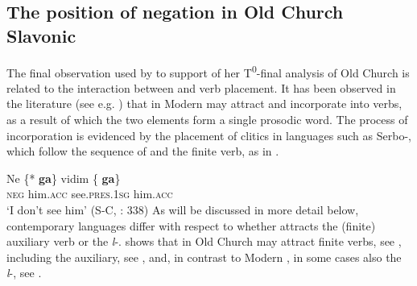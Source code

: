\documentclass[output=paper,modfonts,newtxmath,hidelinks]{langscibook}
\begin{document}
\subsection{The position of negation in Old Church Slavonic} \label{11:s3.2}

The final observation used by \citet{pancheva2008} to support of her T\textsuperscript{0}{}-final analysis of Old Church  is related to the interaction between  and verb placement. It has been observed in the literature (see e.g. \citealt{rivero1991}) that in Modern   may attract and incorporate into verbs, as a result of which the two elements form a single prosodic word. The process of incorporation is evidenced by the placement of  clitics in languages such as Serbo-, which follow the sequence of  and the finite verb, as in .

\ea \label{11:ex21}
\gll Ne \{*\hspace{-2pt} \textbf{ga}\} vidim \{\hspace{-2pt} \textbf{ga}\}\\
     \textsc{neg} {} him.\textsc{acc} see.\textsc{pres.1sg} {} him.\textsc{acc}\\
\glt `I don’t see him' \hfill (S-C, \citealt{rivero1991}: 338)
\z
As will be discussed in more detail below, contemporary  languages differ with respect to whether  attracts the (finite) auxiliary verb or the \textit{l}{}-. \citet{pancheva2008} shows that in Old Church   may attract finite verbs, see , including the auxiliary, see , and, in contrast to Modern , in some cases also the \textit{l}{}-, see .
\end{document}
